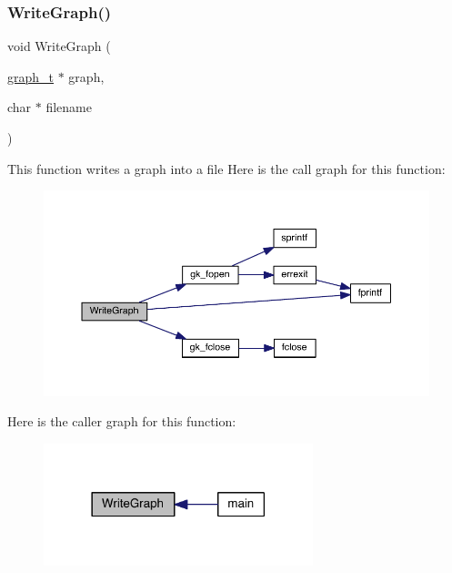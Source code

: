 \subsubsection{\texorpdfstring{Write\+Graph()}{WriteGraph()}}
{\footnotesize\ttfamily void Write\+Graph (\begin{DoxyParamCaption}\item[{\hyperlink{a00734}{graph\+\_\+t} $\ast$}]{graph,  }\item[{char $\ast$}]{filename }\end{DoxyParamCaption})}

This function writes a graph into a file Here is the call graph for this function\+:\nopagebreak
\begin{figure}[H]
\begin{center}
\leavevmode
\includegraphics[width=350pt]{a00858_a91b3b24f2b508da8f2e2df7bc2c94cc6_cgraph}
\end{center}
\end{figure}
Here is the caller graph for this function\+:\nopagebreak
\begin{figure}[H]
\begin{center}
\leavevmode
\includegraphics[width=222pt]{a00858_a91b3b24f2b508da8f2e2df7bc2c94cc6_icgraph}
\end{center}
\end{figure}
\mbox{\label{a00858_a358cab47bd66ff23614f7f24996ba64c}} 
